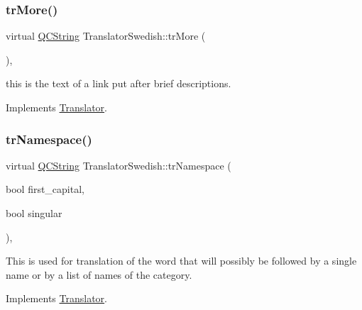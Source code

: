 \mbox{\label{class_translator_swedish_a1eb7501e5f51086d66a561144140c86c}} 
\subsubsection{\texorpdfstring{trMore()}{trMore()}}
{\footnotesize\ttfamily virtual \mbox{\hyperlink{class_q_c_string}{Q\+C\+String}} Translator\+Swedish\+::tr\+More (\begin{DoxyParamCaption}{ }\end{DoxyParamCaption})\hspace{0.3cm}{\ttfamily [inline]}, {\ttfamily [virtual]}}

this is the text of a link put after brief descriptions. 

Implements \mbox{\hyperlink{class_translator}{Translator}}.

\mbox{\label{class_translator_swedish_aa9a556538d0a25b97bdae7576b4b46c1}} 
\subsubsection{\texorpdfstring{trNamespace()}{trNamespace()}}
{\footnotesize\ttfamily virtual \mbox{\hyperlink{class_q_c_string}{Q\+C\+String}} Translator\+Swedish\+::tr\+Namespace (\begin{DoxyParamCaption}\item[{bool}]{first\+\_\+capital,  }\item[{bool}]{singular }\end{DoxyParamCaption})\hspace{0.3cm}{\ttfamily [inline]}, {\ttfamily [virtual]}}

This is used for translation of the word that will possibly be followed by a single name or by a list of names of the category. 

Implements \mbox{\hyperlink{class_translator}{Translator}}.

\mbox{\label{class_translator_swedish_a18d9c3c16bc2e6930c0ece6b138a8b0c}} 
